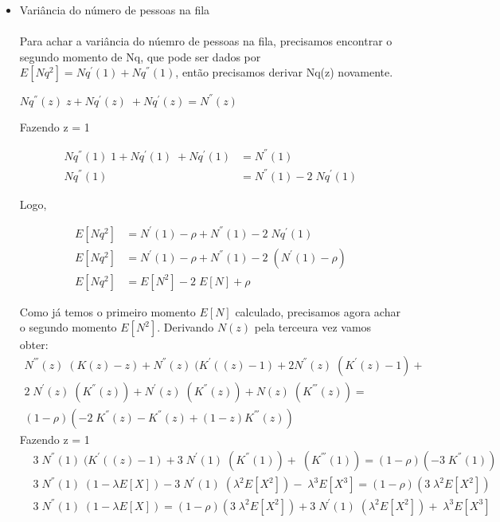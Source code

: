 \documentclass[a4paper]{article}
\begin{document}
\begin{itemize}
    \item Variância do número de pessoas na fila\\\\
    Para achar a variância do núemro de pessoas na fila, precisamos encontrar o segundo momento de Nq, que pode ser dados por \(E[Nq^2] = Nq^{'}(1) + Nq^{''}(1)\), então precisamos derivar Nq(z) novamente.
    \begin{center}
            \(Nq^{''}(z)\;z + Nq^{'}(z)\; + Nq^{'}(z)=N^{''}(z)\)
    \end{center}
    Fazendo z = 1 
    \begin{center}
         \begin{align*}
            Nq^{''}(1)\;1 + Nq^{'}(1)\; + Nq^{'}(1)&=N^{''}(1)\\
            Nq^{''}(1) &=N^{''}(1) - 2\;Nq^{'}(1)
         \end{align*}
    \end{center}
    Logo, 
    \begin{center}
         \begin{align*}
            E[Nq^2] &= N^{'}(1) -\rho + N^{''}(1) - 2\;Nq^{'}(1)\\
            E[Nq^2] &= N^{'}(1) -\rho + N^{''}(1) - 2\;(N^{'}(1) -\rho)\\
            E[Nq^2] &= E[N^2]-2\;E[N] + \rho
         \end{align*}
    \end{center}
    Como já temos o primeiro momento \(E[N]\) calculado, precisamos agora achar o segundo momento \(E[N^2]\). Derivando \(N(z)\) pela terceura vez vamos obter:
    \begin{align*}
           N^{'''}(z)\;(K(z)-z) +N^{''}(z)\;(K^{'}((z)-1)+ 2N^{''}(z)\;(K^{'}(z)-1) +\\
           2\;N^{'}(z)\;(K^{''}(z)) + N^{'}(z)\;(K^{''}(z))+  N(z)\;(K^{'''}(z)) =\\
           (1-\rho)(-2\;K^{''}(z)-K^{''}(z)+ (1-z)K^{'''}(z))
    \end{align*}
    Fazendo z = 1 
    \begin{align*}
           &3\;N^{''}(1)\;(K^{'}((z)-1) + 3\;N^{'}(1)\;(K^{''}(1)) + \;(K^{'''}(1)) =(1-\rho)(-3\;K^{''}(1))\\
           &3\;N^{''}(1)\;(1-\lambda E[X]) - 3\;N^{'}(1)\;(\lambda^2 E[X^2]) - \;\lambda^3 E[X^3] =(1-\rho)(3\;\lambda^2 E[X^2])\\
           &3\;N^{''}(1)\;(1-\lambda E[X])=(1-\rho)(3\;\lambda^2 E[X^2]) +3\;N^{'}(1)\;(\lambda^2 E[X^2]) + \;\lambda^3 E[X^3] \\

\end{align*}
\end{itemize}
\end{document}
